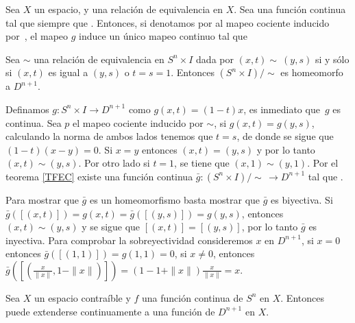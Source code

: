 \begin{Teo}\label{TFEC}
Sea $X$ un espacio, y \mm{\sim} una relación de equivalencia en
$X$. Sea  una función continua tal que
 siempre que . Entonces, si denotamos por
 al mapeo cociente inducido
por~\mm{\sim}, el mapeo $g$ induce un único mapeo continuo
 tal que 
\end{Teo}
\begin{Lema}\label{lemah}
Sea $\sim$ una relación de equivalencia en $S^n\times I$ dada por $(x,t)\sim ~(y,s)$ si y sólo si $(x,t)$ es igual a $(y,s)$ o $t \!=\! s \!=\! 1$. Entonces $(S^n\times I)/\!\!\sim$ es homeomorfo a $D^{n+1}$.
\end{Lema}
\begin{Dem}

Definamos $g\colon S^n\times I\rightarrow D^{n+1}$ como $g(x,t) =
(1-t)x$, es inmediato que~$g$ es continua. Sea $p$ el mapeo cociente inducido por $\sim$, si $g(x,t) = g(y,s)$, calculando la norma de ambos lados tenemos que  $t = s$, de donde se sigue que $(1-t)(x-y)=0$. Si $x = y$ entonces $(x,t) = (y,s)$ y por lo tanto $(x,t)\sim (y,s)$. Por otro lado si $t = 1$, se tiene que $(x,1)\sim(y,1)$.
Por el teorema \ref{TFEC} existe una función continua $\bar{g}\colon (S^n\times I)/\!\!\!\sim\,\rightarrow D^{n+1}$ tal que .

Para mostrar que $\bar{g}$ es un homeomorfismo basta mostrar que $\bar{g}$ es biyectiva.
Si  $\bar{g}([(x,t)]) =g(x,t)= \bar{g}([(y,s)]) = g(y,s)$, entonces
$(x,t)\sim (y,s)$ y se sigue que $[(x,t)] = [(y,s)]$, por lo tanto $\bar{g}$ es inyectiva.
Para comprobar la sobreyectividad consideremos $x$ en $D^{n+1}$, si $x=0$ entonces $\bar{g}([(1,1)])= g(1,1) = 0$, si $x\neq 0$, entonces $\bar{g}([(\frac{x}{\parallel x\parallel},1-\| x\|)]) = (1-1+\| x\|)\frac{x}{\parallel x\parallel} = x$. 



\end{Dem}
\begin{Teo}
Sea $X$ un espacio contraíble y $f$ una función continua de $S^n$ en $X$. Entonces  puede extenderse continuamente a una función de $D^{n+1}$ en $X$.
\end{Teo}
 
